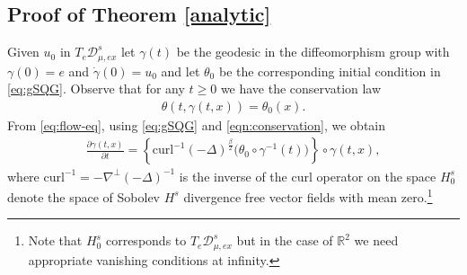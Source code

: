\documentclass[11pt]{amsart}
\numberwithin{equation}{section}
\begin{document}
	\subsection{Proof of Theorem \ref{analytic}}
Given $u_0$ in $ T_e\mathcal{D}_{\mu, ex}^s$ let $\gamma(t)$ be the geodesic in the diffeomorphism group with $\gamma(0)=e$ and $\dot{\gamma}(0)=u_0$ and let $\theta_0$ be the corresponding initial condition in \eqref{eq:gSQG}. Observe that for any $t\ge 0$ we have the conservation law
 \begin{align}\label{eqn:conservation}
     \theta(t,\gamma(t,x))=\theta_0(x).
 \end{align}
From \eqref{eq:flow-eq}, using \eqref{eq:gSQG} and \eqref{eqn:conservation}, we obtain
 \begin{align}\label{eqn:flow_intermof_gamma}
    \frac{\partial \gamma(t,x)}{\partial t}=\left\{\mbox{curl}^{-1} \left(-\Delta\right)^{\frac{\beta}{2}}\big(\theta_0\circ \gamma^{-1}(t)\big)\right\}\circ \gamma(t,x),
 \end{align}
where $\mbox{curl}^{-1} =-\nabla^{\perp}(-\Delta)^{-1}$ is the inverse of the $\text{curl}$ operator on the space $H_0^s$ denote the space of Sobolev $H^s$ divergence free vector fields with mean zero.\footnote{ Note that $H_0^s$ corresponds to $T_e\mathcal{D}_{\mu, ex}^s$ but in the case of $\mathbb{R}^2$ we need appropriate vanishing conditions at infinity. }
 
\end{document}
